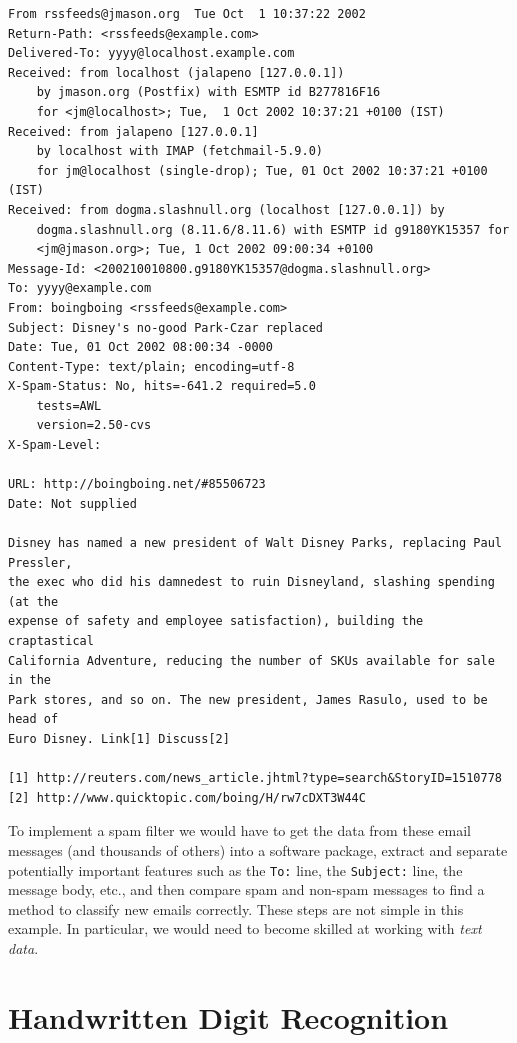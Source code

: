 \documentclass[]{krantz}
\begin{document}
\begin{verbatim}
From rssfeeds@jmason.org  Tue Oct  1 10:37:22 2002
Return-Path: <rssfeeds@example.com>
Delivered-To: yyyy@localhost.example.com
Received: from localhost (jalapeno [127.0.0.1])
    by jmason.org (Postfix) with ESMTP id B277816F16
    for <jm@localhost>; Tue,  1 Oct 2002 10:37:21 +0100 (IST)
Received: from jalapeno [127.0.0.1]
    by localhost with IMAP (fetchmail-5.9.0)
    for jm@localhost (single-drop); Tue, 01 Oct 2002 10:37:21 +0100 (IST)
Received: from dogma.slashnull.org (localhost [127.0.0.1]) by
    dogma.slashnull.org (8.11.6/8.11.6) with ESMTP id g9180YK15357 for
    <jm@jmason.org>; Tue, 1 Oct 2002 09:00:34 +0100
Message-Id: <200210010800.g9180YK15357@dogma.slashnull.org>
To: yyyy@example.com
From: boingboing <rssfeeds@example.com>
Subject: Disney's no-good Park-Czar replaced
Date: Tue, 01 Oct 2002 08:00:34 -0000
Content-Type: text/plain; encoding=utf-8
X-Spam-Status: No, hits=-641.2 required=5.0
    tests=AWL
    version=2.50-cvs
X-Spam-Level: 

URL: http://boingboing.net/#85506723
Date: Not supplied

Disney has named a new president of Walt Disney Parks, replacing Paul Pressler, 
the exec who did his damnedest to ruin Disneyland, slashing spending (at the 
expense of safety and employee satisfaction), building the craptastical 
California Adventure, reducing the number of SKUs available for sale in the 
Park stores, and so on. The new president, James Rasulo, used to be head of 
Euro Disney. Link[1] Discuss[2]

[1] http://reuters.com/news_article.jhtml?type=search&StoryID=1510778
[2] http://www.quicktopic.com/boing/H/rw7cDXT3W44C
\end{verbatim}

To implement a spam filter we would have to get the data from these email messages (and thousands of others) into a software package, extract and separate potentially important features such as the \texttt{To:} line, the \texttt{Subject:} line, the message body, etc., and then compare spam and non-spam messages to find a method to classify new emails correctly. These steps are not simple in this example. In particular, we would need to become skilled at working with \emph{text data}.

\hypertarget{handwritten-digit-recognition}{%
\section{Handwritten Digit Recognition}\label{handwritten-digit-recognition}}
\end{document}

